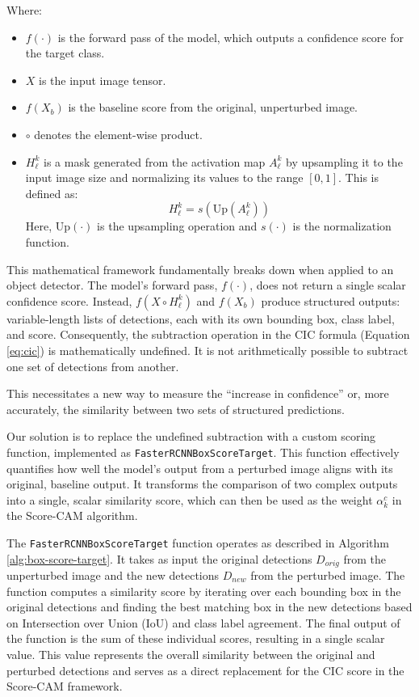 Where:
\begin{itemize}
    \item $f(\cdot)$ is the forward pass of the model, which outputs a confidence score for the target class.
    \item $X$ is the input image tensor.
    \item $f(X_{b})$ is the baseline score from the original, unperturbed image.
    \item $\circ$ denotes the element-wise product.
    \item $H^{k}_{\ell}$ is a mask generated from the activation map $A^{k}_{\ell}$ by upsampling it to the input image size and normalizing its values to the range $[0, 1]$. This is defined as:
    \begin{equation}
        H^{k}_{\ell} = s\left(\text{Up}\left(A^{k}_{\ell}\right)\right)
        \label{eq:mask_generation}
    \end{equation}
    Here, $\text{Up}(\cdot)$ is the upsampling operation and $s(\cdot)$ is the normalization function.
\end{itemize}

This mathematical framework fundamentally breaks down when applied to an object detector. The model's forward pass, $f(\cdot)$, does not return a single scalar confidence score. Instead, $f(X \circ H^{k}_{\ell})$ and $f(X_{b})$ produce structured outputs: variable-length lists of detections, each with its own bounding box, class label, and score. Consequently, the subtraction operation in the CIC formula (Equation \ref{eq:cic}) is mathematically undefined. It is not arithmetically possible to subtract one set of detections from another.

This necessitates a new way to measure the ``increase in confidence'' or, more accurately, the similarity between two sets of structured predictions.

Our solution is to replace the undefined subtraction with a custom scoring function, implemented as \texttt{FasterRCNNBoxScoreTarget}. This function effectively quantifies how well the model's output from a perturbed image aligns with its original, baseline output. It transforms the comparison of two complex outputs into a single, scalar similarity score, which can then be used as the weight $\alpha^{c}_{k}$ in the Score-CAM algorithm.

The \texttt{FasterRCNNBoxScoreTarget} function operates as described in Algorithm \ref{alg:box-score-target}. It takes as input the original detections $D_{orig}$ from the unperturbed image and the new detections $D_{new}$ from the perturbed image. The function computes a similarity score by iterating over each bounding box in the original detections and finding the best matching box in the new detections based on Intersection over Union (IoU) and class label agreement.
The final output of the function is the sum of these individual scores, resulting in a single scalar value. This value represents the overall similarity between the original and perturbed detections and serves as a direct replacement for the CIC score in the Score-CAM framework.


